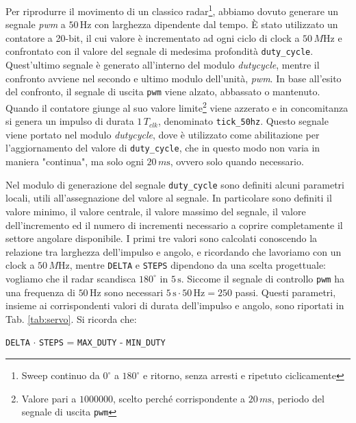 \documentclass[reprint,amsmath,amssymb,aps,rmp,twoside]{revtex4-2}
\begin{document}
Per riprodurre il movimento di un classico radar\footnote{Sweep continuo da $0^\circ$ a $180^\circ$ e ritorno, senza arresti e ripetuto ciclicamente}, abbiamo dovuto generare un segnale \textit{pwm} a $50\,\si{\hertz}$ con larghezza dipendente dal tempo. È stato utilizzato un contatore a 20-bit, il cui valore è incrementato ad ogni ciclo di clock a $50\,\si{M\hertz}$ e confrontato con il valore del segnale di medesima profondità \texttt{duty\_cycle}. Quest'ultimo segnale è generato all'interno del modulo \textit{dutycycle}, mentre il confronto avviene nel secondo e ultimo modulo dell'unità, \textit{pwm}. In base all'esito del confronto, il segnale di uscita \texttt{pwm} viene alzato, abbassato o mantenuto. Quando il contatore giunge al suo valore limite\footnote{Valore pari a $1000000$, scelto perché corrispondente a $20\,\si{m\s}$, periodo del segnale di uscita \texttt{pwm}} viene azzerato e in concomitanza si genera un impulso di durata $1\,\si{T_{clk}}$, denominato \texttt{tick\_50hz}. Questo segnale viene portato nel modulo \textit{dutycycle}, dove è utilizzato come abilitazione per l'aggiornamento del valore di \texttt{duty\_cycle}, che in questo modo non varia in maniera "continua", ma solo ogni $20\,\si{m\s}$, ovvero solo quando necessario.

Nel modulo di generazione del segnale \texttt{duty\_cycle} sono definiti alcuni parametri locali, utili all'assegnazione del valore al segnale. In particolare sono definiti il valore minimo, il valore centrale, il valore massimo del segnale, il valore dell'incremento ed il numero di incrementi necessario a coprire completamente il settore angolare disponibile. I primi tre valori sono calcolati conoscendo la relazione tra larghezza dell'impulso e angolo, e ricordando che lavoriamo con un clock a $50\,\si{M\hertz}$, mentre \texttt{DELTA} e \texttt{STEPS} dipendono da una scelta progettuale: vogliamo che il radar scandisca $180^\circ$ in $5\,\si{\s}$. Siccome il segnale di controllo \texttt{pwm} ha una frequenza di $50\,\si{\hertz}$ sono necessari $5\,\si{\s} \cdot 50\,\si{\hertz} = 250$ passi. Questi parametri, insieme ai corrispondenti valori di durata dell'impulso e angolo, sono riportati in Tab. \ref{tab:servo}. Si ricorda che:

\begin{center}
    \texttt{DELTA} $\cdot$ \texttt{STEPS} = \texttt{MAX\_DUTY} - \texttt{MIN\_DUTY}
\end{center}
\end{document}
